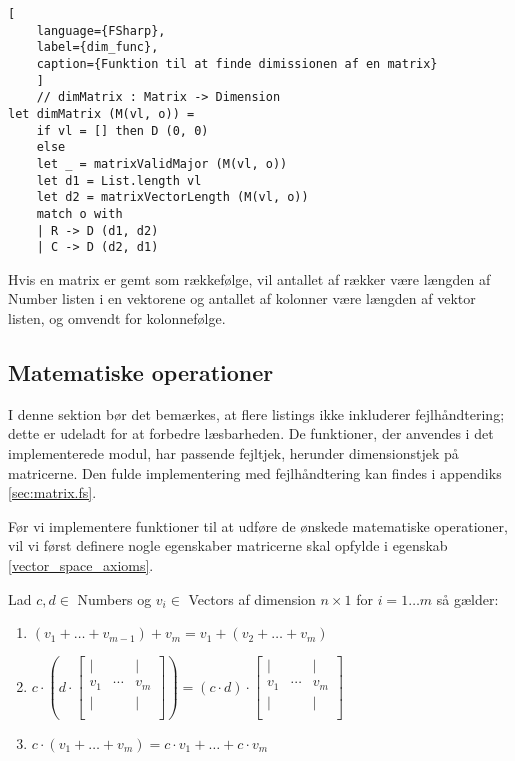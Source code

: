 \begin{lstlisting}[
    language={FSharp}, 
    label={dim_func}, 
    caption={Funktion til at finde dimissionen af en matrix}
    ]
    // dimMatrix : Matrix -> Dimension
let dimMatrix (M(vl, o)) =
    if vl = [] then D (0, 0)
    else
    let _ = matrixValidMajor (M(vl, o))
    let d1 = List.length vl
    let d2 = matrixVectorLength (M(vl, o))
    match o with
    | R -> D (d1, d2)
    | C -> D (d2, d1)
\end{lstlisting}

Hvis en matrix er gemt som rækkefølge, vil antallet af rækker være længden af Number listen i en vektorene og antallet af kolonner være længden af vektor listen, og omvendt for kolonnefølge.

\subsection{Matematiske operationer}
I denne sektion bør det bemærkes, at flere listings ikke inkluderer fejlhåndtering; dette er udeladt for at forbedre læsbarheden. De funktioner, der anvendes i det implementerede modul, har passende fejltjek, herunder dimensionstjek på matricerne. Den fulde implementering med fejlhåndtering kan findes i appendiks \ref{sec:matrix.fs}.

Før vi implementere funktioner til at udføre de ønskede matematiske operationer, vil vi først definere nogle egenskaber matricerne skal opfylde i egenskab \ref{vector_space_axioms}.
\vspace{0.5cm}
\begin{egenskab}\label{vector_space_axioms}
    Lad $c, d \in$ Numbers og $v_i \in $ Vectors af dimension $n \times 1$ for $i = 1 \dots m$ så gælder:
    \begin{enumerate}
        \item $(v_1 + \dots + v_{m-1}) + v_m = v_1 + (v_2 + \dots + v_m)$
        \item $c \cdot \left(d \cdot \begin{bmatrix}
            | &        & | \\
            v_{1} & \cdots & v_{m} \\
            | &        & | \\
        \end{bmatrix}\right) = (c \cdot d) \cdot \begin{bmatrix}
            | &        & | \\
            v_{1} & \cdots & v_{m} \\
            | &        & | \\
        \end{bmatrix}$
        
        \item $c \cdot (v_1 + \dots +v_m) = c \cdot v_1 + \dots +c \cdot v_m$
    \end{enumerate}
\end{egenskab}


